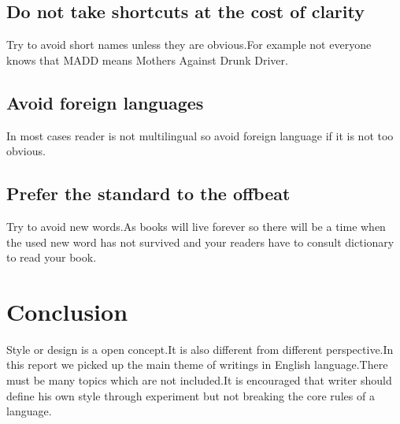 \documentclass{report}
\begin{document}
\section{Do not take shortcuts at the cost of clarity}
Try to avoid short names unless they are obvious.For example not everyone knows that MADD means
Mothers Against Drunk Driver.
\section{Avoid foreign languages}
In most cases reader is not multilingual so avoid foreign language if it is not too obvious.
\section{Prefer the standard to the offbeat}
Try to avoid new words.As books will live forever so there will be a time when the used new word has not survived and your readers have to consult dictionary to read your book.
\chapter{Conclusion}\label{sec:Conclusion}
Style or design is a open concept.It is also different from different perspective.In this report we picked up the main theme of writings in English language.There must be many topics which are not included.It is encouraged that writer should define his own style through experiment but not breaking the core rules of a language.
 
\end{document}
